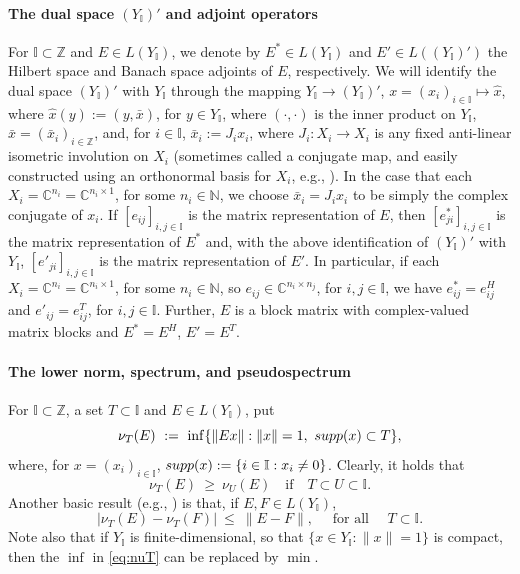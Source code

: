 \documentclass[preprint,1p,11pt]{elsarticle}
\newcommand\C{{\mathbb C}}
\newcommand\N{{\mathbb N}}
\newcommand\I{{\mathbb I}}
\newcommand\Z{{\mathbb Z}}
\newcommand\supp{{\rm supp}}
\numberwithin{equation}{section}   %
\numberwithin{figure}{section}  %
\begin{document}
\paragraph{The dual space $(Y_\I)'$ and adjoint operators} For $\I\subset\Z$ and $E\in L(Y_\I)$, we denote by $E^*\in L(Y_\I)$ and $E'\in L((Y_\I)')$ the Hilbert space and Banach space adjoints of $E$, respectively. We will identify the dual space $(Y_\I)'$ with $Y_{\I}$ through the mapping $Y_\I\to (Y_\I)'$, $x=(x_i)_{i\in \I}\mapsto \hat x$, where $\hat x(y) := (y,\bar x)$,
for $y\in Y_\I$, where $(\cdot,\cdot)$ is the inner product on $Y_\I$, $\bar x=(\bar x_i)_{i\in \Z}$, and, for $i\in \I$, $\bar x_i := J_ix_i$, where $J_i:X_i \to X_i$ is any fixed anti-linear isometric involution on $X_i$ (sometimes called a conjugate map, and easily constructed using an orthonormal basis for $X_i$, e.g., \cite[Conclusion 2.1.18]{SaSc:11}). In the case that each $X_i=\C^{n_i}=\C^{n_i\times 1}$, for some $n_i\in \N$, we choose $\bar x_i = J_i x_i$ to be simply the complex conjugate of $x_i$. If $[e_{ij}]_{i,j\in\I}$ is the matrix representation of $E$, then $[e^*_{ji}]_{i,j\in \I}$ is the matrix representation of $E^*$ and, with the above identification of $(Y_\I)'$ with $Y_\I$, $[e'_{ji}]_{i,j\in \I}$ is the matrix representation of $E'$. In particular,  if each $X_i=\C^{n_i}=\C^{n_i\times 1}$, for some $n_i\in \N$, so  $e_{ij}\in \C^{n_i\times n_j}$, for $i,j\in \I$, we have $e^*_{ij}=e^H_{ij}$ and $e'_{ij}=e_{ij}^T$, for $i,j\in \I$. Further, $E$ is a block matrix with complex-valued matrix blocks  and $E^*=E^H$, $E'=E^T$.


\paragraph{The lower norm, spectrum, and pseudospectrum}
For $\I\subset\Z$, a set $T\subset\I$ and $E\in L(Y_\I)$, put
\begin{equation} \label{eq:nuT}
\nu_T(E)\ :=\ \inf\{\|Ex\|:\|x\|=1,\ \supp(x)\subset T\},
\end{equation}
where, for $x=(x_i)_{i\in\I}$, $\supp(x):=\{i\in\I:x_i\ne 0\}$. Clearly, it holds that
\begin{equation}\label{eq:numon}
\nu_{T}(E)\ \ge\ \nu_{U}(E)
\quad\text{if}\quad
T\subset U\subset\I.
\end{equation}
Another basic result (e.g., \cite[Lemma 2.38]{LiBook}) is that, if $E,F\in L(Y_\I)$,
\begin{equation} \label{eq:Lipschitz}
|\nu_T(E)-\nu_T(F)|\ \le\ \|E-F\|, \quad \mbox{ for all } \quad T\subset \I.
\end{equation}
Note also that if  $Y_\I$ is finite-dimensional, so that $\{x\in Y_\I:\|x\|=1\}$ is compact, then the $\inf$ in \eqref{eq:nuT} can be replaced by $\min$.
\end{document}
